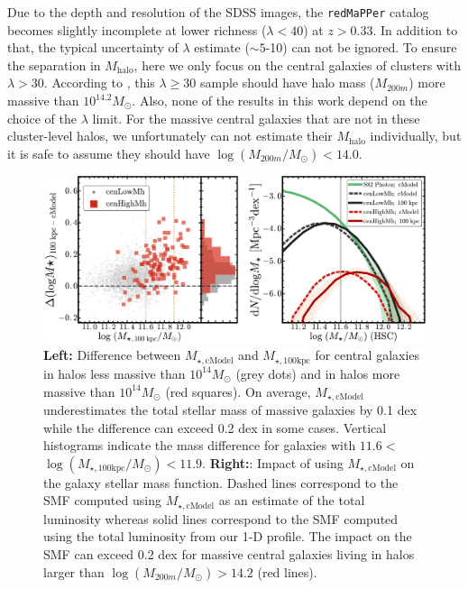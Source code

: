 \documentclass{emulateapj}
\def\redm{\texttt{redMaPPer}}
\def\mhalo{{$M_{\mathrm{halo}}$}}
\def\mtot{{$M_{\star,100\mathrm{kpc}}$}}
\def\mcmodel{{$M_{\star,\mathrm{cModel}}$}}
\def\logmtot{{$\log (M_{\star,100\mathrm{kpc}}/M_{\odot})$}}
\begin{document}
\begin{CJK*}{UTF8}{gbsn}
    Due to the depth and resolution of the SDSS images, the \redm{} catalog 
    becomes slightly incomplete at lower richness ($\lambda < 40$) at $z > 0.33$. 
    In addition to that, the typical uncertainty of $\lambda$ estimate ($\sim 5$-10) 
    can not be ignored. 
    To ensure the separation in \mhalo{}, here we only focus on the central galaxies of
    clusters with $\lambda > 30$. 
    According to \citet{Simet2016}, this $\lambda \geq 30$ sample should have halo mass
    ($M_{200m}$) more massive than $10^{14.2} M_{\odot}$. 
    Also, none of the results in this work depend on the choice of the $\lambda$ 
    limit.
    For the massive central galaxies that are not in these cluster-level halos, 
    we unfortunately can not estimate their \mhalo{} individually, but it is safe 
    to assume they should have $\log (M_{200m}/M_{\odot}) < 14.0$.  
    

  \begin{figure}[bt!]
      \centering 
      \includegraphics[width=\textwidth]{fig/redbcg_smf_new}
      \caption{
          \textbf{Left:} Difference between \mcmodel{} and \mtot{} for central
      	  galaxies in halos less massive than $10^{14} M_{\odot}$ (grey dots) and 
      	  in halos more massive than $10^{14} M_{\odot}$ (red squares). 
          On average, \mcmodel{} underestimates the total stellar mass of massive 
          galaxies by 0.1 dex while the difference can exceed 0.2 dex in some cases.
          Vertical histograms indicate the mass difference for galaxies with
          $11.6<$\logmtot{}$<11.9$. 
          \textbf{Right:}: Impact of using \mcmodel{} on the galaxy stellar mass
          function. 
          Dashed lines correspond to the SMF computed using \mcmodel{} as an estimate
          of the total luminosity whereas solid lines correspond to the SMF computed
          using the total luminosity from our 1-D profile. 
          The impact on the SMF can exceed 0.2 dex for massive central galaxies 
          living in halos larger than $\log (M_{200m}/M_{\odot}) > 14.2$ (red lines).
          }
      \label{fig:smf1}
  \end{figure}
          

\end{CJK*}
\end{document}
